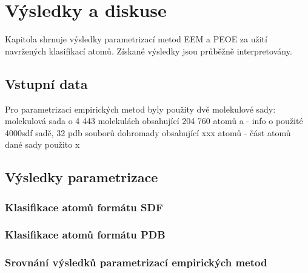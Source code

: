 \chapter{Výsledky a diskuse}
Kapitola shrnuje výsledky parametrizací metod EEM a PEOE za užití navržených klasifikací atomů. Získané výsledky jsou průběžně interpretovány.

\section{Vstupní data}
Pro parametrizaci empirických metod byly použity dvě molekulové sady: molekulová sada o 4 443 molekulách obsahující 204 760 atomů a 
- info o použité 4000sdf sadě, 32 pdb souborů dohromady obsahující xxx atomů
- část atomů dané sady použito x  
\section{Výsledky parametrizace}
\subsection{Klasifikace atomů formátu SDF}
\subsection{Klasifikace atomů formátu PDB}
\subsection{Srovnání výsledků parametrizací empirických metod}